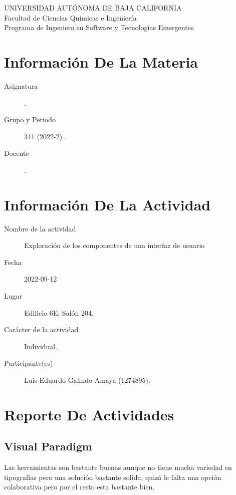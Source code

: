 \documentclass[12pt]{article}
\begin{document}
\thispagestyle{empty}
\begin{center}
	{\large
		UNIVERSIDAD AUTÓNOMA DE BAJA CALIFORNIA \\
		Facultad de Ciencias Químicas e Ingeniería }
	\vspace{0.25in} \\
	Programa de Ingeniero en Software y Tecnologías Emergentes
\end{center}

\section*{Información De La Materia}
\label{sec:orgdb0c26e}
\begin{mdframed}
\begin{description}
\item[{Asignatura}] \asignatura .
\item[{Grupo y Periodo}] 341 (2022-2) .
\item[{Docente}] \docente .
\end{description}
\end{mdframed}

\section*{Información De La Actividad}
\label{sec:orgfd8dc67}
\begin{mdframed}
\begin{description}
\item[{Nombre de la actividad}] Exploración de los componentes de una interfaz de usuario
\item[{Fecha}] 2022-09-12
\item[{Lugar}] Edificio 6E, Salón 204.
\item[{Carácter de la actividad}] Individual.
\item[{Participante(es)}] Luis Eduardo Galindo Amaya (1274895).
\end{description}
\end{mdframed}

\section*{Reporte De Actividades}
\label{sec:org4763368}
\subsection*{Visual Paradigm}
\label{sec:org708a0d8}
Las herramientas son bastante buenas aunque no tiene mucha variedad en tipografías pero una solución bastante solida, quizá le falta una opción colaborativa pero por el resto esta bastante bien.
\end{document}
